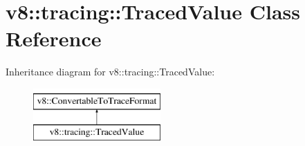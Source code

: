 \hypertarget{classv8_1_1tracing_1_1TracedValue}{}\section{v8\+:\+:tracing\+:\+:Traced\+Value Class Reference}
\label{classv8_1_1tracing_1_1TracedValue}
Inheritance diagram for v8\+:\+:tracing\+:\+:Traced\+Value\+:\begin{figure}[H]
\begin{center}
\leavevmode
\includegraphics[height=2.000000cm]{classv8_1_1tracing_1_1TracedValue}
\end{center}
\end{figure}
